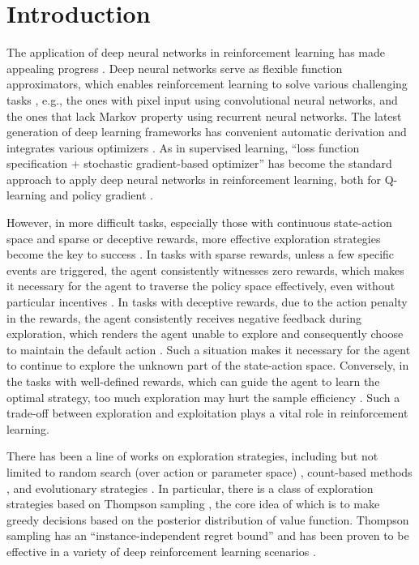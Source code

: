 \section{Introduction}
The application of deep neural networks in reinforcement learning has made appealing progress \cite{DQN,AlphaGO,OpenAIdota}. Deep neural networks serve as flexible function approximators, which enables reinforcement learning to solve various challenging tasks \cite{DQN,RN395}, e.g., the ones with pixel input using convolutional neural networks, and the ones that lack Markov property using recurrent neural networks. The latest generation of deep learning frameworks has convenient automatic derivation and integrates various optimizers \cite{PyTorch,MXNet,TF}. As in supervised learning,  ``loss function specification + stochastic gradient-based optimizer'' has become the standard approach to apply deep neural networks in reinforcement learning, both for Q-learning and policy gradient \cite{DDPG,DQN,PPO}.

However, in more difficult tasks, especially those with continuous state-action space and sparse or deceptive rewards, more effective exploration strategies become the key to success \cite{pnoise,colas2018gep}. In tasks with sparse rewards, unless a few specific events are triggered, the agent consistently witnesses zero rewards, which makes it necessary for the agent to traverse the policy space effectively, even without particular incentives \cite{VIME}. In tasks with deceptive rewards, due to the action penalty in the rewards, the agent consistently receives negative feedback during exploration, which renders the agent unable to explore and consequently choose to maintain the default action \cite{lehman2011abandoning,conti2018improving}. Such a situation makes it necessary for the agent to continue to explore the unknown part of the state-action space. Conversely, in the tasks with well-defined rewards, which can guide the agent to learn the optimal strategy, too much exploration may hurt the sample efficiency \cite{Showdown}. Such a trade-off between exploration and exploitation plays a vital role in reinforcement learning.

There has been a line of works on exploration strategies, including but not limited to random search (over action or parameter space) \cite{pnoise,DDPG}, count-based methods \cite{count1,count2}, and evolutionary strategies \cite{EPGRL,ERL2}. In particular, there is a class of exploration strategies based on Thompson sampling \cite{TS}, the core idea of which is to make greedy decisions based on the posterior distribution of value function. Thompson sampling has an ``instance-independent regret bound” \cite{TStutorial} and has been proven to be effective in a variety of deep reinforcement learning scenarios \cite{BDQN,VIME,dropoutInference,lastLayerBayes}.

